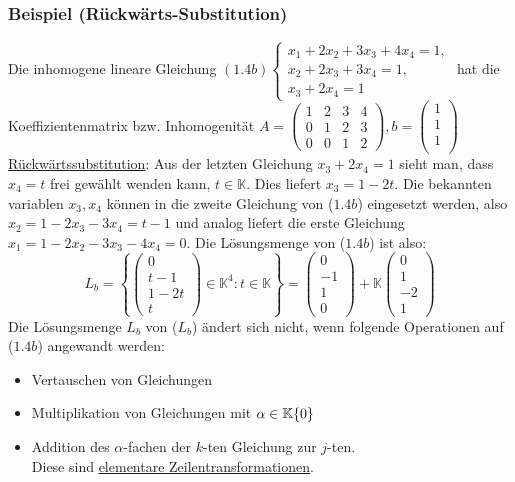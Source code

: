 \subsubsection{Beispiel (Rückwärts-Substitution)}
Die inhomogene lineare Gleichung $(1.4b)\begin{cases}x_1+2x_2+3x_3+4x_4=1,\\ x_2+2x_3+3x_4=1,\\x_3+2x_4=1\end{cases}$ hat die Koeffizientenmatrix bzw. Inhomogenität $A=\left(\begin{array}{cccc}1 & 2 & 3 & 4 \\ 0 & 1 & 2 & 3\\ 0 & 0 & 1 & 2\end{array}\right), b=\left(\begin{array}{c}1\\ 1\\ 1\\\end{array}\right)$\\
\underline{Rückwärtssubstitution}: Aus der letzten Gleichung $x_3+2x_4=1$ sieht man, dass $x_4=t$ frei gewählt wenden kann, $t\in \mathbb{K}$.  Dies liefert $x_3=1-2t$.  Die bekannten variablen $x_3,x_4$ können in die zweite Gleichung von ($1.4b$) eingesetzt werden, also $x_2 = 1-2x_3-3x_4=t-1$ und analog liefert die erste Gleichung $x_1=1-2x_2-3x_3-4x_4=0$.  Die Lösungsmenge von ($1.4b$) ist also:\[L_b=\left\{\left(\begin{array}{c}0\\ t-1\\ 1-2t\\ t\end{array}\right)\in \mathbb{K}^4:t\in\mathbb{K}\right\} = \left(\begin{array}{c}0\\ -1\\ 1\\ 0\end{array}\right)+\mathbb{K}\left(\begin{array}{c}0\\ 1\\ -2 \\1\end{array}\right)\]
Die Lösungsmenge $L_b$ von ($L_b$) ändert sich nicht, wenn folgende Operationen auf ($1.4b$) angewandt werden:
\begin{itemize}
\item Vertauschen von Gleichungen
\item Multiplikation von Gleichungen mit $\alpha \in \mathbb{K}\\\{0\}$
\item Addition des $\alpha$-fachen der $k$-ten Gleichung zur $j$-ten.\\
Diese sind \underline{elementare Zeilentransformationen}.
\end{itemize}
